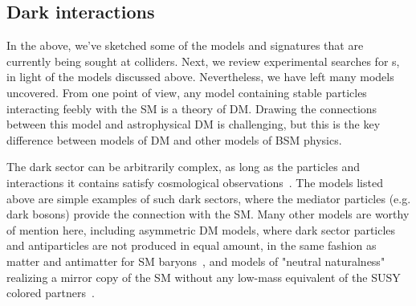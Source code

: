 \subsection{Dark interactions}
\label{sec:darkint}

In the above, we've sketched some of the models and signatures that are currently being sought at colliders. Next, we review experimental searches for {\IP}s, in light of the models discussed above. Nevertheless, we have left many models uncovered. From one point of view, any model containing stable particles interacting feebly with the SM is a theory of DM. Drawing the connections between this model and astrophysical DM is challenging, but this is the key difference between models of DM and other models of BSM physics. 

The dark sector can be arbitrarily complex, as long as the particles and interactions it contains satisfy cosmological observations~\cite{Strassler:2006im, Evans:2017kti}. The models listed above are simple examples of such dark sectors, where the mediator particles (e.g. dark bosons) provide the connection with the SM. Many other models are worthy of mention here, including asymmetric DM models, where dark sector particles and antiparticles are not produced in equal amount, in the same fashion as matter and antimatter for SM baryons~\cite{Zurek:2013wia}, and models of "neutral naturalness" realizing a mirror copy of the SM without any low-mass equivalent of the SUSY colored partners~\cite{Craig:2014aea}. 


